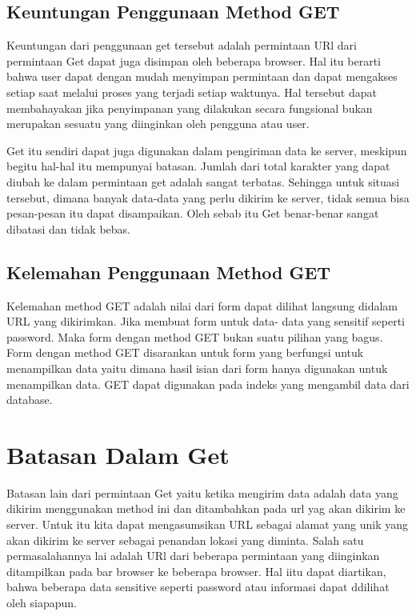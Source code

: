 \subsection{Keuntungan Penggunaan Method GET}
Keuntungan dari penggunaan get tersebut adalah permintaan URl dari permintaan Get dapat juga disimpan oleh beberapa browser.
Hal itu berarti bahwa user dapat dengan mudah menyimpan permintaan dan dapat mengakses setiap saat melalui proses yang terjadi setiap 
waktunya. Hal tersebut dapat membahayakan jika penyimpanan yang dilakukan secara fungsional bukan merupakan sesuatu yang diinginkan oleh 
pengguna atau user.

Get itu sendiri dapat juga digunakan dalam pengiriman data ke server, meskipun begitu hal-hal itu mempunyai batasan. 
Jumlah dari total karakter yang dapat diubah ke dalam permintaan get adalah sangat terbatas. Sehingga untuk situasi tersebut, dimana 
banyak data-data yang perlu dikirim  ke server, tidak semua bisa pesan-pesan itu dapat disampaikan. Oleh sebab itu Get benar-benar 
sangat dibatasi dan tidak bebas.

\subsection{Kelemahan Penggunaan Method GET}
Kelemahan method GET adalah nilai dari form dapat dilihat langsung didalam URL yang dikirimkan. Jika membuat form untuk data-
data yang  sensitif seperti password. Maka form  dengan method GET bukan suatu pilihan yang bagus. Form dengan method GET 
disarankan untuk form yang berfungsi untuk menampilkan data  yaitu dimana hasil isian dari form hanya digunakan untuk  
menampilkan data.  GET dapat digunakan pada indeks yang mengambil data dari database.

\section{Batasan Dalam Get}
Batasan lain dari permintaan Get yaitu ketika mengirim data adalah data yang dikirim menggunakan method ini dan ditambahkan pada url yag 
akan dikirim ke server. Untuk itu kita dapat mengasumsikan URL sebagai alamat yang unik yang akan dikirim ke server sebagai penandan 
lokasi yang diminta. Salah satu permasalahannya lai adalah URl dari beberapa permintaan yang diinginkan ditampilkan pada bar browser ke 
beberapa browser. Hal iitu dapat diartikan, bahwa beberapa data sensitive seperti password atau informasi dapat ddilihat oleh siapapun.

